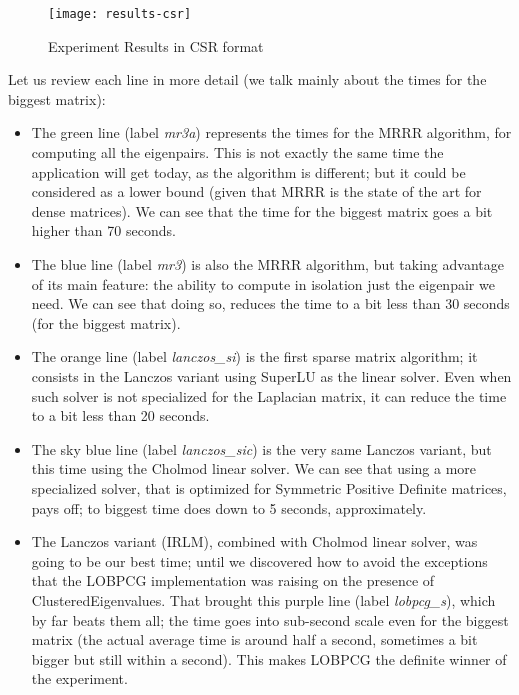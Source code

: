 \begin{figure}[H]
  \centering
  \caption{Experiment Results in CSR format}  
  \texttt{[image: results-csr]}
\end{figure}

Let us review each line in more detail (we talk mainly about the times
for the biggest matrix):

\begin{itemize}
\item The green line (label \emph{mr3a}) represents the times for the
  \gls{MRRR} algorithm, for 
  computing all the eigenpairs. This is not exactly the same time
  the application will get today, as the algorithm is different; but
  it could be considered as a lower bound (given that \gls{MRRR} is the
  state of the art for dense matrices). We can see that the time for
  the biggest matrix goes a bit higher than 70 seconds.
\item The blue line (label \emph{mr3}) is also the \gls{MRRR} algorithm, but
  taking advantage of its main feature: the ability to compute in
  isolation just the eigenpair we need. We can see that doing so,
  reduces the time to a bit less than 30 seconds (for the biggest
  matrix).
\item The orange line (label \emph{lanczos\_si}) is the first sparse
  matrix algorithm; it consists in the Lanczos variant using \gls{SuperLU}
  as the linear solver. Even when such solver is not specialized for
  the \gls{Laplacian} matrix, it can reduce the time to a bit less than 20
  seconds.
  \item The sky blue line (label \emph{lanczos\_sic}) is the very same
    Lanczos variant, but this time using the \gls{Cholmod} linear solver. We
    can see that using a more specialized solver, that is optimized
    for Symmetric Positive Definite matrices, pays off; to biggest
    time does down to 5 seconds, approximately.
  \item The Lanczos variant (\gls{IRLM}), combined with \gls{Cholmod} linear
    solver, was going to be our best time; until we discovered how to
    avoid the exceptions that the \gls{LOBPCG} implementation was raising on
    the presence of \gls{ClusteredEigenvalues}. That brought this purple
    line (label \emph{lobpcg\_s}), which by far beats them all; the time
    goes into sub-second scale even for the biggest matrix (the actual
    average time is around half a second, sometimes a bit bigger but
    still within a second). This makes \gls{LOBPCG} the definite winner of
    the experiment. 
\end{itemize}

